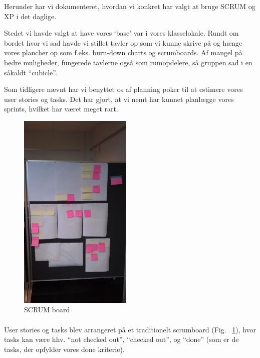 \documentclass[12pt, a4paper]{report}
\begin{document}
Herunder har vi dokumenteret, hvordan vi konkret har valgt at bruge SCRUM og XP i det daglige.

Stedet vi havde valgt at have vores ‘base’ var i vores klasselokale. Rundt om bordet hvor vi sad havde vi stillet tavler op som vi kunne skrive på og hænge vores plancher op som f.eks. burn-down charts og scrumboards. Af mangel på bedre muligheder, fungerede tavlerne også som rumopdelere, så gruppen sad i en såkaldt “cubicle”.

Som tidligere nævnt har vi benyttet os af planning poker til at estimere vores user stories og tasks. Det har gjort, at vi nemt har kunnet planlægge vores sprints, hvilket har været meget rart.

\begin{figure}
\begin{center}
\vspace{-1cm}
\includegraphics[width=0.48\textwidth]{scrumboard}
\caption{SCRUM board}
\end{center}
\label{s_board}
\end{figure}
\paragraph{}
\vspace*{-1\parskip}

User stories og tasks blev arrangeret på et traditionelt scrumboard (Fig. ~\ref{s_board}), hvor tasks kan være hhv. “not checked out”, “checked out”, og “done” (som er de tasks, der opfylder vores done kriterie).
\end{document}
